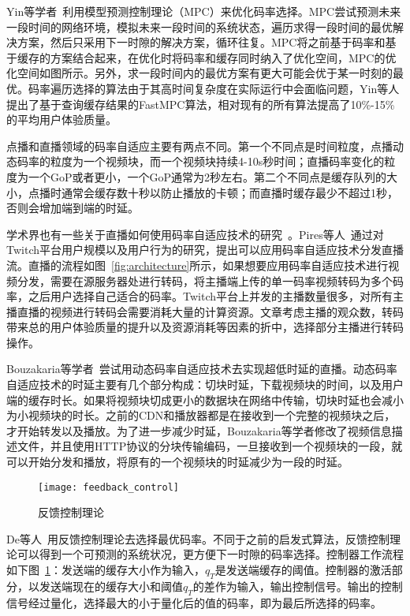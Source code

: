 Yin等学者~\cite{yin2015control}利用模型预测控制理论（MPC）来优化码率选择。MPC尝试预测未来一段时间的网络环境，模拟未来一段时间的系统状态，遍历求得一段时间的最优解决方案，然后只采用下一时隙的解决方案，循环往复。MPC将之前基于码率和基于缓存的方案结合起来，在优化时将码率和缓存同时纳入了优化空间，MPC的优化空间如图所示。另外，求一段时间内的最优方案有更大可能会优于某一时刻的最优。码率遍历选择的算法由于其高时间复杂度在实际运行中会面临问题，Yin等人提出了基于查询缓存结果的FastMPC算法，相对现有的所有算法提高了10\%-15\%的平均用户体验质量。

点播和直播领域的码率自适应主要有两点不同。第一个不同点是时间粒度，点播动态码率的粒度为一个视频块，而一个视频块持续4-10s秒时间；直播码率变化的粒度为一个GoP或者更小，一个GoP通常为2秒左右。第二个不同点是缓存队列的大小，点播时通常会缓存数十秒以防止播放的卡顿；而直播时缓存最少不超过1秒，否则会增加端到端的时延。

学术界也有一些关于直播如何使用码率自适应技术的研究~\cite{nihei2017qoe}。Pires等人~\cite{pires2014dash}通过对Twitch平台用户规模以及用户行为的研究，提出可以应用码率自适应技术分发直播流。直播的流程如图~\ref{fig:architecture}所示，如果想要应用码率自适应技术进行视频分发，需要在源服务器处进行转码，将主播端上传的单一码率视频转码为多个码率，之后用户选择自己适合的码率。Twitch平台上并发的主播数量很多，对所有主播直播的视频进行转码会需要消耗大量的计算资源。文章考虑主播的观众数，转码带来总的用户体验质量的提升以及资源消耗等因素的折中，选择部分主播进行转码操作。

Bouzakaria等学者~\cite{bouzakaria2014overhead}尝试用动态码率自适应技术去实现超低时延的直播。动态码率自适应技术的时延主要有几个部分构成：切块时延，下载视频块的时间，以及用户端的缓存时长。如果将视频块切成更小的数据块在网络中传输，切块时延也会减小为小视频块的时长。之前的CDN和播放器都是在接收到一个完整的视频块之后，才开始转发以及播放。为了进一步减少时延，Bouzakaria等学者修改了视频信息描述文件，并且使用HTTP协议的分块传输编码，一旦接收到一个视频块的一段，就可以开始分发和播放，将原有的一个视频块的时延减少为一段的时延。

\begin{figure}[h]%
  \centering
  \texttt{[image: feedback\_control]}
  \caption{反馈控制理论~\cite{de2011feedback}}
  \label{fig:feedback_control}
\end{figure}

De等人~\cite{de2011feedback}用反馈控制理论去选择最优码率。不同于之前的启发式算法，反馈控制理论可以得到一个可预测的系统状况，更方便下一时隙的码率选择。控制器工作流程如下图~\ref{fig:feedback_control}：发送端的缓存大小作为输入，$q_T$是发送端缓存的阈值。控制器的激活部分，以发送端现在的缓存大小和阈值$q_T$的差作为输入，输出控制信号。输出的控制信号经过量化，选择最大的小于量化后的值的码率，即为最后所选择的码率。

